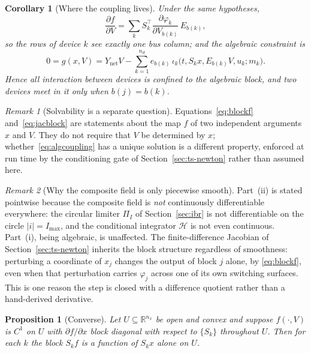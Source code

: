\documentclass[12pt,a4paper]{article}
\newtheorem{proposition}{Proposition}
\newtheorem{corollary}{Corollary}
\theoremstyle{remark}
\newtheorem{remark}{Remark}
\begin{document}
\begin{corollary}[Where the coupling lives]\label{cor:coupling}
Under the same hypotheses,
\begin{equation*}
  \frac{\partial f}{\partial V}
   =\sum_k S_k^{\top}
     \frac{\partial\varphi_k}{\partial V_{b(k)}}\,E_{b(k)},
\end{equation*}
so the rows of device $k$ see exactly one bus column; and the algebraic constraint
is
\begin{equation}
  0=g(x,V)=Y_{\mathrm{net}}V-\sum_{k=1}^{n_d}e_{b(k)}\,
    \iota_k\bigl(t,S_kx,E_{b(k)}V,u_k;m_k\bigr).
  \label{eq:algcoupling}
\end{equation}
Hence all interaction between devices is confined to the algebraic block, and two
devices meet in it only when $b(j)=b(k)$.
\end{corollary}

\begin{remark}[Solvability is a separate question]\label{rem:wellposed}
Equations~\eqref{eq:blockf} and~\eqref{eq:jacblock} are statements about the map
$f$ of two independent arguments $x$ and $V$. They do not require that $V$ be
determined by $x$; whether~\eqref{eq:algcoupling} has a unique solution is a
different property, enforced at run time by the conditioning gate of
Section~\ref{sec:ts-newton} rather than assumed here.
\end{remark}

\begin{remark}[Why the composite field is only piecewise smooth]\label{rem:nonsmooth}
Part~(ii) is stated pointwise because the composite field is \emph{not}
continuously differentiable everywhere: the circular limiter $\Pi_I$ of
Section~\ref{sec:ibr} is not differentiable on the circle $|i|=I_{\max}$, and the
conditional integrator $\mathcal{H}$ is not even continuous. Part~(i), being
algebraic, is unaffected. The finite-difference Jacobian of
Section~\ref{sec:ts-newton} inherits the block structure regardless of smoothness:
perturbing a coordinate of $x_j$ changes the output of block $j$ alone, by
\eqref{eq:blockf}, even when that perturbation carries $\varphi_j$ across one of
its own switching surfaces. This is one reason the step is closed with a
difference quotient rather than a hand-derived derivative.
\end{remark}

\begin{proposition}[Converse]\label{prop:converse}
Let $U\subseteq\mathbb{R}^{n_x}$ be open and convex and suppose $f(\cdot,V)$ is
$C^1$ on $U$ with $\partial f/\partial x$ block diagonal with respect to
$\{S_k\}$ throughout $U$. Then for each $k$ the block $S_kf$ is a function of
$S_kx$ alone on $U$.
\end{proposition}
\end{document}
